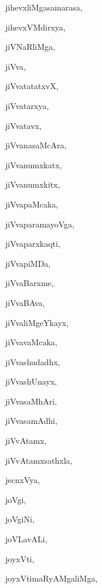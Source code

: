 \begin{multicols}{3}
{\noindent
{jihevxliMgasamarasa}, \pageref{jihevxliMgasamarasa}

\noindent
{jihevxVMdirxya}, \pageref{jihevxVMdirxya}

\noindent
{jiVNaRliMga}, \pageref{jiVNaRliMga}

\noindent
{jiVva}, \pageref{jiVva}

\noindent
{jiVvatatatxvX}, \pageref{jiVvatatatxvX}

\noindent
{jiVvatarxya}, \pageref{jiVvatarxya}

\noindent
{jiVvatavx}, \pageref{jiVvatavx}

\noindent
{jiVvanasaMcAra}, \pageref{jiVvanasaMcAra}

\noindent
{jiVvanumxkatx}, \pageref{jiVvanumxkatx}

\noindent
{jiVvanumxkitx}, \pageref{jiVvanumxkitx}

\noindent
{jiVvapaMcaka}, \pageref{jiVvapaMcaka}

\noindent
{jiVvaparamayoVga}, \pageref{jiVvaparamayoVga}

\noindent
{jiVvaparxkaqti}, \pageref{jiVvaparxkaqti}

\noindent
{jiVvapiMDa}, \pageref{jiVvapiMDa}

\noindent
{jiVvaBarxme}, \pageref{jiVvaBarxme}

\noindent
{jiVvaBAva}, \pageref{jiVvaBAva}

\noindent
{jiVvaliMgeYkayx}, \pageref{jiVvaliMgeYkayx}

\noindent
{jiVvavaMcaka}, \pageref{jiVvavaMcaka}

\noindent
{jiVvashudadhx}, \pageref{jiVvashudadhx}

\noindent
{jiVvashUnayx}, \pageref{jiVvashUnayx}

\noindent
{jiVvasaMhAri}, \pageref{jiVvasaMhAri}

\noindent
{jiVvasamAdhi}, \pageref{jiVvasamAdhi}

\noindent
{jiVvAtamx}, \pageref{jiVvAtamx}

\noindent
{jiVvAtamxsathxla}, \pageref{jiVvAtamxsathxla}

\noindent
{jecnxVya}, \pageref{jecnxVya}

\noindent
{joVgi}, \pageref{joVgi}

\noindent
{joVgiNi}, \pageref{joVgiNi}

\noindent
{joVLavALi}, \pageref{joVLavALi}

\noindent
{joyxVti}, \pageref{joyxVti}

\noindent
{joyxVtimaRyAMgaliMga}, \pageref{joyxVtimaRyAMgaliMga}

}
\end{multicols}
